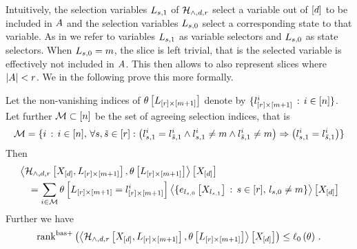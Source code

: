 Intuitively, the selection variables $L_{s,1}$ of $\mathcal{H}_{\land,d,r}$ select a variable out of $[d]$ to be included in $A$ and the selection variables $L_{s,0}$ select a corresponding state to that variable.
As in  we refer to variables $L_{s,1}$ as variable selectors and $L_{s,0}$ as state selectors.
When $L_{s,0}=m$, the slice is left trivial, that is the selected variable is effectively not included in $A$.
This then allows to also represent slices where $\left|A\right|<r$.
We in the following prove this more formally.

\begin{theorem}
    Let the non-vanishing indices of $\theta\left[L_{[r]\times[m+1]}\right]$ denote by $\{l_{[r]\times[m+1]}^{i} \, : \, i\in[n]\}$.
    Let further $\mathcal{M}\subset[n]$ be the set of agreeing selection indices, that is
    \begin{align*}
        \mathcal{M} = \{ i \, : \, i\in[n],\,
        \forall{s,\tilde{s}\in[r]} : \big( l_{s,1}^i= l_{\tilde{s},1}^i  \land l_{s,1}^i\neq m \land l_{\tilde{s},1}^i \neq m \big)
        \Rightarrow \big(l_{s,1}^i = l_{\tilde{s},1}^i \big)
        \}
    \end{align*}
    Then
    \begin{align*}
        &\left\langle \mathcal{H}_{\land,d,r}\left[X_{[d]},L_{[r]\times[m+1]}\right],\theta\left[L_{[r]\times[m+1]}\right]\right\rangle \left[ X_{[d]} \right] \\
        &\quad = \sum_{i\in\mathcal{M}} \theta\left[L_{[r]\times[m+1]}=l_{[r]\times[m+1]}^{i}\right]
        \left\langle \{e_{l_{s,0}}\left[X_{l_{s,1}}\right] \, : \, s\in[r], \, l_{s,0}\neq m \}\right\rangle \left[ X_{[d]} \right]
    \end{align*}
    Further we have
    \begin{align*}
        \mathrm{rank}^{\mathrm{bas+}}\left(\left\langle \mathcal{H}_{\land,d,r}\left[X_{[d]},L_{[r]\times[m+1]}\right],\theta\left[L_{[r]\times[m+1]}\right]\right\rangle \left[ X_{[d]} \right]\right)
        \leq \ell_0\left(\theta\right) \, .
    \end{align*}
\end{theorem}
